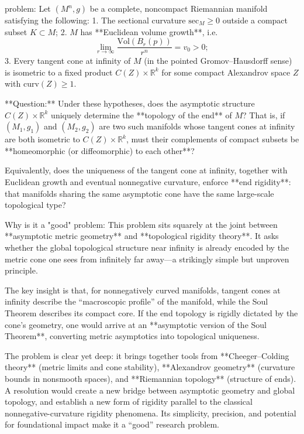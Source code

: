 problem:  
Let \( (M^n, g) \) be a complete, noncompact Riemannian manifold satisfying the following:  
1. The sectional curvature \( \mathrm{sec}_M \ge 0 \) outside a compact subset \( K \subset M \);  
2. \( M \) has **Euclidean volume growth**, i.e.  
   \[
   \lim_{r \to \infty} \frac{\mathrm{Vol}(B_r(p))}{r^n} = v_0 > 0;
   \]
3. Every tangent cone at infinity of \(M\) (in the pointed Gromov–Hausdorff sense) is isometric to a fixed product \( C(Z) \times \mathbb{R}^k \) for some compact Alexandrov space \( Z \) with \( \mathrm{curv}(Z) \ge 1 \).

**Question:**  
Under these hypotheses, does the asymptotic structure \( C(Z)\times\mathbb{R}^k \) uniquely determine the **topology of the end** of \( M \)?  
That is, if \( (M_1, g_1) \) and \( (M_2, g_2) \) are two such manifolds whose tangent cones at infinity are both isometric to \( C(Z)\times\mathbb{R}^k \), must their complements of compact subsets be **homeomorphic (or diffeomorphic) to each other**?  

Equivalently, does the uniqueness of the tangent cone at infinity, together with Euclidean growth and eventual nonnegative curvature, enforce **end rigidity**: that manifolds sharing the same asymptotic cone have the same large-scale topological type?

Why is it a "good" problem:  
This problem sits squarely at the joint between **asymptotic metric geometry** and **topological rigidity theory**. It asks whether the global topological structure near infinity is already encoded by the metric cone one sees from infinitely far away—a strikingly simple but unproven principle.  

The key insight is that, for nonnegatively curved manifolds, tangent cones at infinity describe the “macroscopic profile” of the manifold, while the Soul Theorem describes its compact core. If the end topology is rigidly dictated by the cone’s geometry, one would arrive at an **asymptotic version of the Soul Theorem**, converting metric asymptotics into topological uniqueness.  

The problem is clear yet deep: it brings together tools from **Cheeger–Colding theory** (metric limits and cone stability), **Alexandrov geometry** (curvature bounds in nonsmooth spaces), and **Riemannian topology** (structure of ends). A resolution would create a new bridge between asymptotic geometry and global topology, and establish a new form of rigidity parallel to the classical nonnegative-curvature rigidity phenomena. Its simplicity, precision, and potential for foundational impact make it a “good” research problem.